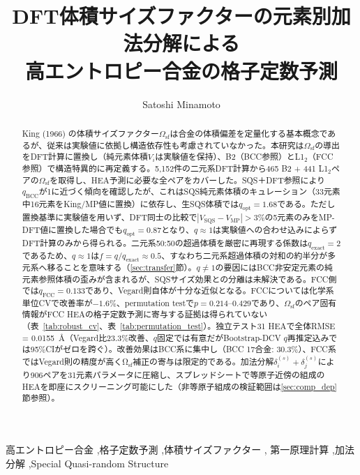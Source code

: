 \documentclass[5p,10pt]{elsarticle}
\begin{document}
\begin{frontmatter}

\title{DFT体積サイズファクターの元素別加法分解による\\
高エントロピー合金の格子定数予測}

\author{Satoshi Minamoto}
\address{物質・材料研究機構 (NIMS), 茨城県つくば市}

\begin{abstract}
King (1966) の体積サイズファクター$\Omega_\text{sf}$は合金の体積偏差を定量化する基本概念であるが、従来は実験値に依拠し構造依存性も考慮されていなかった。本研究は$\Omega_\text{sf}$の導出をDFT計算に置換し（純元素体積$V_i$は実験値を保持）、B2（BCC参照）とL1$_2$（FCC参照）で構造特異的に再定義する。5,152件の二元系DFT計算から465 B2 + 441 L1$_2$ペアの$\Omega_\text{sf}$を取得し、HEA予測に必要な全ペアをカバーした。SQS＋DFT参照により$q_\text{BCC}$が1に近づく傾向を確認したが、これはSQS純元素体積のキュレーション（33元素中16元素をKing/MP値に置換）に依存し、生SQS体積では$q_\text{opt} = 1.68$である。ただし置換基準に実験値を用いず、DFT同士の比較で$|V_\text{SQS}-V_\text{MP}|>3\%$の5元素のみをMP-DFT値に置換した場合でも$q_\text{opt} = 0.87$となり、$q \approx 1$は実験値への合わせ込みによらずDFT計算のみから得られる。二元系50:50の超過体積を厳密に再現する係数は$q_\text{exact} = 2$であるため、$q \approx 1$は$f = q/q_\text{exact} \approx 0.5$、すなわち二元系超過体積の対和の約半分が多元系へ移ることを意味する（\ref{sec:transfer}節）。$q \neq 1$の要因にはBCC非安定元素の純元素参照体積の歪みが含まれるが、SQSサイズ効果との分離は未解決である。FCC側では$q_\text{FCC} = 0.133$であり、Vegard則自体が十分な近似となる。FCCについては化学系単位CVで改善率が$-1.6\%$、permutation testで$p = 0.214$--$0.429$であり、$\Omega_\text{sf}$のペア固有情報がFCC HEAの格子定数予測に寄与する証拠は得られていない（表~\ref{tab:robust_cv}、表~\ref{tab:permutation_test}）。独立テスト31 HEAで全体RMSE = 0.0155~\AA{}（Vegard比23.3\%改善、$q$固定では有意だがBootstrap-DCV $q$再推定込みでは95\%CIがゼロを跨ぐ）。改善効果はBCC系に集中し（BCC 17合金: 30.3\%）、FCC系ではVegard則の精度が高くΩ$_\text{sf}$補正の寄与は限定的である。加法分解$\delta_i^{(s)} + \delta_j^{(s)}$により906ペアを31元素パラメータに圧縮し、スプレッドシートで等原子近傍の組成のHEAを即座にスクリーニング可能にした（非等原子組成の検証範囲は\ref{sec:comp_dep}節参照）。
\end{abstract}

\begin{keyword}
高エントロピー合金 \sep 格子定数予測 \sep 体積サイズファクター \sep
第一原理計算 \sep 加法分解 \sep Special Quasi-random Structure
\end{keyword}

\end{frontmatter}
\end{document}

